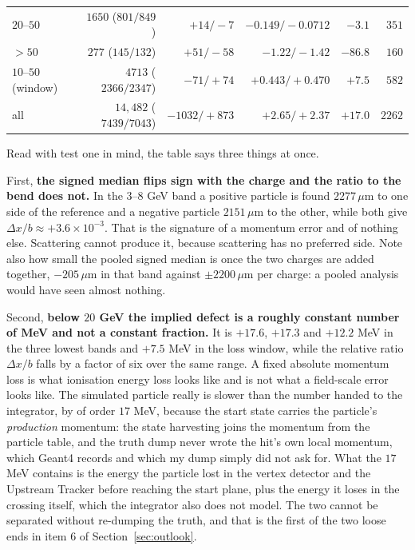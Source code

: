\documentclass[11pt,a4paper]{article}
\newcommand{\um}{\ensuremath{\,\mu\mathrm{m}}}
\begin{document}
\begin{table}[tbp]
\begin{tabular}{lrrrrr}
    $20$--$50$ & $1650$ ($801/849$)     & $+14 / -7$      & $-0.149 / -0.0712$& $-3.1$  & $351$ \\
    $>50$      & $277$ ($145/132$)      & $+51 / -58$     & $-1.22 / -1.42$   & $-86.8$ & $160$ \\
    \midrule
    $10$--$50$ (window) & $4713$ ($2366/2347$) & $-71 / +74$ & $+0.443 / +0.470$ & $+7.5$ & $582$ \\
    \midrule
    all        & $14{,}482$ ($7439/7043$) & $-1032 / +873$ & $+2.65 / +2.37$ & $+17.0$ & $2262$ \\
    \bottomrule
  \end{tabular}
\end{table}

Read with test one in mind, the table says three things at once.

First, \textbf{the signed median flips sign with the charge and the ratio to the
bend does not.} In the $3$--$8$ GeV band a positive particle is found $2277\um$
to one side of the reference and a negative particle $2151\um$ to the other,
while both give $\Delta x / b \approx +3.6 \times 10^{-3}$. That is the signature
of a momentum error and of nothing else. Scattering cannot produce it, because
scattering has no preferred side. Note also how small the pooled signed median
is once the two charges are added together, $-205\um$ in that band against
$\pm 2200\um$ per charge: a pooled analysis would have seen almost nothing.

Second, \textbf{below $20$ GeV the implied defect is a roughly constant number
of MeV and not a constant fraction.} It is $+17.6$, $+17.3$ and $+12.2$ MeV in
the three lowest bands and $+7.5$ MeV in the loss window, while the relative
ratio $\Delta x / b$ falls by a factor of six over the same range. A fixed absolute momentum loss is what ionisation energy loss looks like
and is not what a field-scale error looks like. The simulated particle really is
slower than the number handed to the integrator, by of order $17$ MeV, because
the start state carries the particle's \emph{production} momentum: the state
harvesting joins the momentum from the particle table, and the truth dump never
wrote the hit's own local momentum, which Geant4 records and which my dump
simply did not ask for. What the $17$ MeV contains is the energy the particle
lost in the vertex detector and the Upstream Tracker before reaching the start
plane, plus the energy it loses in the crossing itself, which the integrator also
does not model. The two cannot be separated without re-dumping the truth, and
that is the first of the two loose ends in item 6 of
Section~\ref{sec:outlook}.
\end{document}
